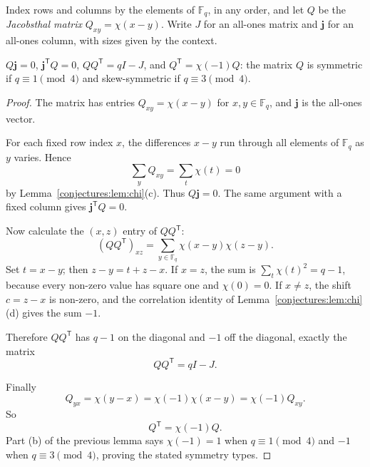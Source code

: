 Index rows and columns by the elements of $\mathbb F_q$, in any order, and let $Q$ be the \emph{Jacobsthal matrix} $Q_{xy}=\chi(x-y)$. Write $J$ for an
all-ones matrix and $\mathbf j$ for an all-ones column, with sizes given by the context.

\begin{lemma}\label{conjectures:lem:jacobsthal}
$Q\mathbf j=0$, $\mathbf j^{\mathsf T}Q=0$, $QQ^{\mathsf T}=qI-J$, and $Q^{\mathsf T}=\chi(-1)Q$: the matrix $Q$ is symmetric if $q\equiv1\pmod4$ and
skew-symmetric if $q\equiv3\pmod4$.
\end{lemma}
\begin{proof}
The matrix has entries
$Q_{xy}=\chi(x-y)$ for
$x,y\in\mathbb F_q$, and
$\mathbf j$ is the all-ones vector.

For each fixed row index $x$,
the differences $x-y$ run through
all elements of $\mathbb F_q$
as $y$ varies. Hence
\[
\sum_y Q_{xy}=\sum_t\chi(t)=0
\]
by Lemma~\ref{conjectures:lem:chi}(c).
Thus $Q\mathbf j=0$.
The same argument with a fixed
column gives $\mathbf j^{\mathsf T}Q=0$.

Now calculate the $(x,z)$ entry
of $QQ^{\mathsf T}$:
\[
(QQ^{\mathsf T})_{xz}
=\sum_{y\in\mathbb F_q}
\chi(x-y)\chi(z-y).
\]
Set $t=x-y$; then $z-y=t+z-x$.
If $x=z$, the sum is
$\sum_t\chi(t)^2=q-1$,
because every non-zero value
has square one and $\chi(0)=0$.
If $x\ne z$, the shift $c=z-x$
is non-zero, and the correlation
identity of Lemma~\ref{conjectures:lem:chi}(d)
gives the sum $-1$.

Therefore $QQ^{\mathsf T}$ has
$q-1$ on the diagonal and $-1$
off the diagonal, exactly the
matrix
\[
\boxed{QQ^{\mathsf T}=qI-J}.
\]

Finally
\[
Q_{yx}=\chi(y-x)
=\chi(-1)\chi(x-y)
=\chi(-1)Q_{xy}.
\]
So
\[
\boxed{Q^{\mathsf T}=\chi(-1)Q}.
\]
Part (b) of the previous lemma says
$\chi(-1)=1$ when $q\equiv1\pmod4$
and $-1$ when $q\equiv3\pmod4$,
proving the stated symmetry types.
\end{proof}

